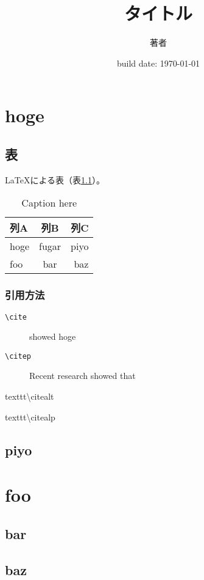 \documentclass[dvipdfmx, 11pt, a4paper]{jsbook}
\title{タイトル}
\date{build date: \today}
\author{著者}
\begin{document}
\maketitle
\tableofcontents


\chapter{hoge}

\blindtext

\section{表}


\LaTeX による表（表\ref{table:label_here}）。

\begin{table}[hbtp]
  \caption{Caption here}
  \label{table:label_here}
  \centering
  \begin{tabular}{lcr}
    \hline
    列A  & 列B  &  列C  \\
    \hline \hline
    hoge  & fugar  & piyo \\
    foo  & bar  & baz \\
    \hline
  \end{tabular}
\end{table}


\blindtext

\subsection{引用方法}
\begin{description}
  \item[\texttt{\textbackslash cite}]\cite{doe2021-my-excelent} showed hoge
  \item[\texttt{\textbackslash citep}]Recent research \citep{doe2021-my-excelent} showed that
  \item[texttt{\textbackslash citealt}]\citealt{doe2021-my-excelent}
  \item[texttt{\textbackslash citealp}]\citealp{doe2021-my-excelent}
\end{description}



\section{piyo}

\blindtext

\chapter{foo}

\blindtext

\section{bar}

\blindtext

\section{baz}

\blindtext


\end{document}
